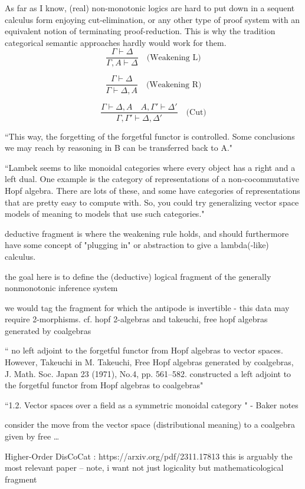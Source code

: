 \documentclass[a4paper,11pt]{report}
\begin{document}
As far as I know, (real) non-monotonic logics are hard to put down in a sequent calculus form enjoying cut-elimination, or any other type of proof system with an equivalent notion of terminating proof-reduction. This is why the tradition categorical semantic approaches hardly would work for them.
\[
\frac{\Gamma \vdash \Delta}{\Gamma, A \vdash \Delta} \quad \text{(Weakening L)}
\]

\[
\frac{\Gamma \vdash \Delta}{\Gamma \vdash \Delta, A} \quad \text{(Weakening R)}
\]

\[
\frac{\Gamma \vdash \Delta, A \quad A, \Gamma' \vdash \Delta'}{\Gamma, \Gamma' \vdash \Delta, \Delta'} \quad \text{(Cut)}
\]


``This way, the forgetting of the forgetful functor is controlled.
Some conclusions we may reach by reasoning in B can be transferred
back to A." 

``Lambek seems to like monoidal categories where every object has a right and a left dual. One example is the category of representations of a non-cocommutative Hopf algebra. There are lots of these, and some have categories of representations that are pretty easy to compute with. So, you could try generalizing vector space models of meaning to models that use such categories."

deductive fragment is where the weakening rule holds, and should furthermore have some concept of "plugging in" or abstraction to give a lambda(-like) calculus. 

the goal here is to define the (deductive) logical fragment of the generally nonmonotonic inference system 

we would tag the fragment for which the antipode is invertible - this data may require 2-morphisms. cf. hopf 2-algebras and takeuchi, free hopf algebras generated by coalgebras

`` no left adjoint to the forgetful functor from Hopf algebras to vector spaces. However, Takeuchi in M. Takeuchi, Free Hopf algebras generated by coalgebras, J. Math. Soc. Japan 23 (1971), No.4, pp. 561–582.
constructed a left adjoint to the forgetful functor from Hopf algebras to coalgebras"

``1.2. Vector spaces over a field as a symmetric monoidal category
" - Baker notes

consider the move from the vector space (distributional meaning) to a coalgebra given by free \dots

Higher-Order DisCoCat : https://arxiv.org/pdf/2311.17813
this is arguably the most relevant paper -- note, i want not just logicality but mathematicological fragment 
\end{document}
